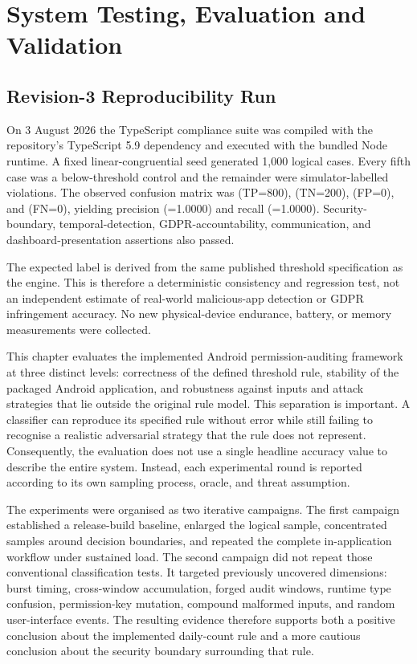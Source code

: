 \newpage
\section{System Testing, Evaluation and Validation}

\subsection{Revision-3 Reproducibility Run}

On 3 August 2026 the TypeScript compliance suite was compiled with the repository's TypeScript 5.9 dependency and executed with the bundled Node runtime. A fixed linear-congruential seed generated 1,000 logical cases. Every fifth case was a below-threshold control and the remainder were simulator-labelled violations. The observed confusion matrix was (TP=800), (TN=200), (FP=0), and (FN=0), yielding precision (=1.0000) and recall (=1.0000). Security-boundary, temporal-detection, GDPR-accountability, communication, and dashboard-presentation assertions also passed.

The expected label is derived from the same published threshold specification as the engine. This is therefore a deterministic consistency and regression test, not an independent estimate of real-world malicious-app detection or GDPR infringement accuracy. No new physical-device endurance, battery, or memory measurements were collected.

This chapter evaluates the implemented Android permission-auditing framework at three distinct levels: correctness of the defined threshold rule, stability of the packaged Android application, and robustness against inputs and attack strategies that lie outside the original rule model. This separation is important. A classifier can reproduce its specified rule without error while still failing to recognise a realistic adversarial strategy that the rule does not represent. Consequently, the evaluation does not use a single headline accuracy value to describe the entire system. Instead, each experimental round is reported according to its own sampling process, oracle, and threat assumption.

The experiments were organised as two iterative campaigns. The first campaign established a release-build baseline, enlarged the logical sample, concentrated samples around decision boundaries, and repeated the complete in-application workflow under sustained load. The second campaign did not repeat those conventional classification tests. It targeted previously uncovered dimensions: burst timing, cross-window accumulation, forged audit windows, runtime type confusion, permission-key mutation, compound malformed inputs, and random user-interface events. The resulting evidence therefore supports both a positive conclusion about the implemented daily-count rule and a more cautious conclusion about the security boundary surrounding that rule.

